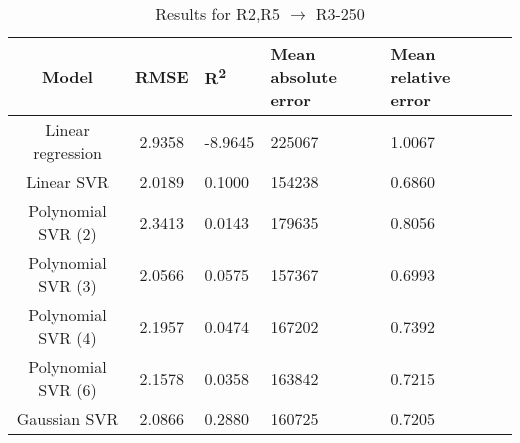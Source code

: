 \begin{table}[H]
\centering
\begin{adjustbox}{center}
\begin{tabular}{c | c M{1.2cm} M{2.5cm} M{2.5cm} M{1.8cm}}
Model & RMSE & R\textsuperscript{2} & Mean absolute error & Mean relative error \tabularnewline
\hline
Linear regression & 2.9358 & -8.9645 & 225067 & 1.0067 \\
Linear SVR & 2.0189 & 0.1000 & 154238 & 0.6860 \\
Polynomial SVR (2) & 2.3413 & 0.0143 & 179635 & 0.8056 \\
Polynomial SVR (3) & 2.0566 & 0.0575 & 157367 & 0.6993 \\
Polynomial SVR (4) & 2.1957 & 0.0474 & 167202 & 0.7392 \\
Polynomial SVR (6) & 2.1578 & 0.0358 & 163842 & 0.7215 \\
Gaussian SVR & 2.0866 & 0.2880 & 160725 & 0.7205 \\
\end{tabular}
\end{adjustbox}
\\
\caption{Results for R2,R5 $\rightarrow$ R3-250}
\label{tab:coreonly_linear_R2,R5_R3_250}
\end{table}
